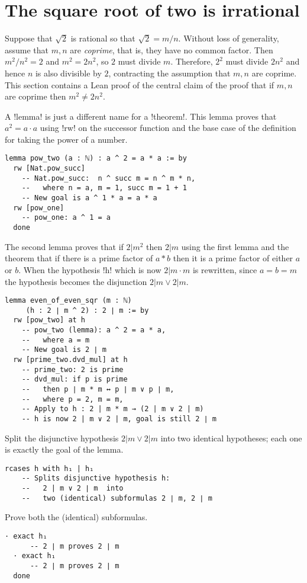 
\section{The square root of two is irrational}

Suppose that $\sqrt{2}$ is rational so that $\sqrt{2}=m/n$. Without loss of generality, assume that $m,n$ are \emph{coprime}, that is, they have no common factor. Then $m^2/n^2=2$ and $m^2=2n^2$, so $2$ must divide $m$. Therefore, $2^2$ must divide $2n^2$ and hence $n$ is also divisible by $2$, contracting the assumption that $m,n$ are coprime. This section contains a Lean proof of the central claim of the proof that if $m,n$ are coprime then $m^2\neq 2n^2$.

A !lemma! is just a different name for a !theorem!. This lemma proves that $a^2=a\cdot a$ using !rw! on the successor function and the base case of the definition for taking the power of a number.
\begin{Verbatim}
lemma pow_two (a : ℕ) : a ^ 2 = a * a := by
  rw [Nat.pow_succ]
    -- Nat.pow_succ:  n ^ succ m = n ^ m * n,
    --   where n = a, m = 1, succ m = 1 + 1
    -- New goal is a ^ 1 * a = a * a
  rw [pow_one]
    -- pow_one: a ^ 1 = a
  done
\end{Verbatim}

The second lemma proves that if $2 | m^2$ then $2 | m$ using the first lemma and the theorem that if there is a prime factor of $a*b$ then it is a prime factor of either $a$ or $b$. When the hypothesis !h! which is now $2| m \cdot m$ is rewritten, since $a=b=m$ the hypothesis becomes the disjunction $2 | m \vee 2 | m$.
\begin{Verbatim}[firstnumber=last]
lemma even_of_even_sqr (m : ℕ)
     (h : 2 ∣ m ^ 2) : 2 ∣ m := by
  rw [pow_two] at h
    -- pow_two (lemma): a ^ 2 = a * a,
    --   where a = m
    -- New goal is 2 ∣ m
  rw [prime_two.dvd_mul] at h
    -- prime_two: 2 is prime
    -- dvd_mul: if p is prime 
    --   then p ∣ m * m ↔ p ∣ m ∨ p ∣ m,
    --   where p = 2, m = m,
    -- Apply to h : 2 | m * m → (2 | m ∨ 2 | m)
    -- h is now 2 | m ∨ 2 | m, goal is still 2 ∣ m
\end{Verbatim}

Split the disjunctive hypothesis $2 | m \vee 2 | m$ into two identical hypotheses; each one is exactly the goal of the lemma.

\begin{Verbatim}[firstnumber=last]
  rcases h with h₁ | h₁
    -- Splits disjunctive hypothesis h: 
    --   2 | m ∨ 2 ∣ m  into
    --   two (identical) subformulas 2 ∣ m, 2 ∣ m
\end{Verbatim}
Prove both the (identical) subformulas.
\begin{Verbatim}[firstnumber=last]
  · exact h₁
      -- 2 ∣ m proves 2 ∣ m
  · exact h₁
      -- 2 ∣ m proves 2 ∣ m
  done
\end{Verbatim}

